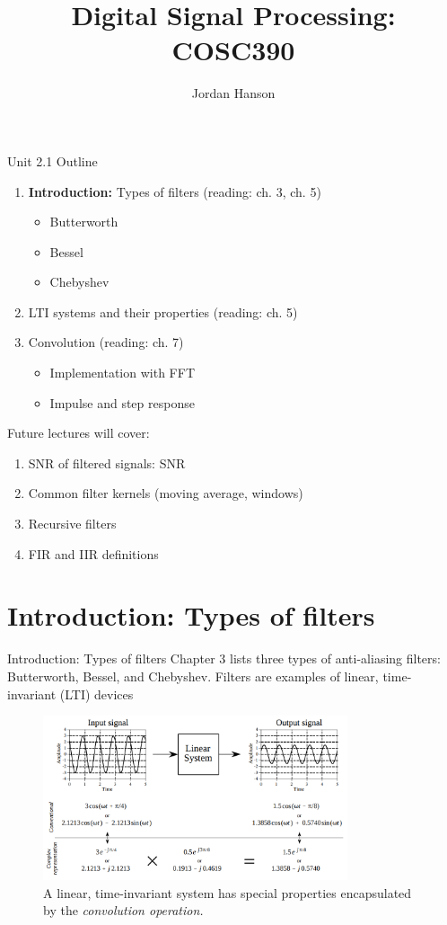 \documentclass{beamer}
\title{Digital Signal Processing: COSC390}
\author{Jordan Hanson}
\institute{Whittier College Department of Physics and Astronomy}
\begin{document}
\maketitle

\begin{frame}{Unit 2.1 Outline}
\begin{enumerate}
\item \alert{\textbf{Introduction:} Types of filters} (reading: ch. 3, ch. 5)
\begin{itemize}
\item \alert{Butterworth}
\item \alert{Bessel}
\item \alert{Chebyshev}
\end{itemize}
\item \alert{LTI systems and their properties} (reading: ch. 5)
\item \alert{Convolution} (reading: ch. 7)
\begin{itemize}
\item \alert{Implementation with FFT}
\item \alert{Impulse and step response}
\end{itemize}
\end{enumerate}
Future lectures will cover:
\begin{enumerate}
\item SNR of filtered signals: SNR
\item Common filter kernels (moving average, windows)
\item Recursive filters
\item FIR and IIR definitions
\end{enumerate}
\end{frame}

\section{Introduction: Types of filters}

\begin{frame}{Introduction: Types of filters}
\small
Chapter 3 lists three types of anti-aliasing filters: Butterworth, Bessel, and Chebyshev.
Filters are examples of linear, time-invariant (LTI) devices
\begin{figure}
\centering
\includegraphics[width=0.8\textwidth]{figures/LTI1.png}
\caption{\label{fig:lti} A linear, time-invariant system has special properties encapsulated by the \textit{convolution operation.}}
\end{figure}
\end{frame}
\end{document}
